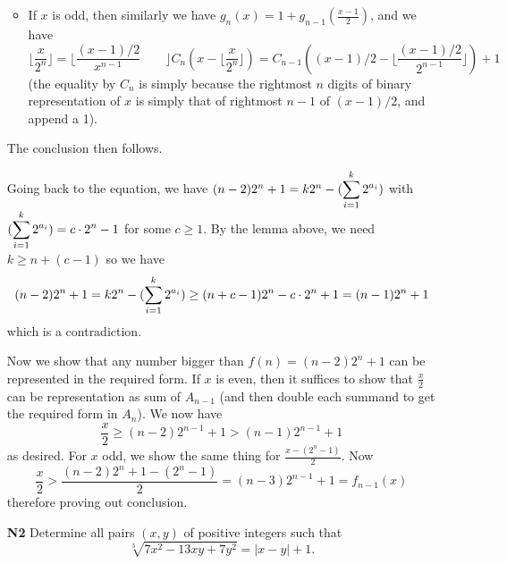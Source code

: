 \documentclass[11pt,a4paper]{article}
\begin{document}
\begin{enumerate}
\begin{itemize}
		\item If $x$ is odd, then similarly we have $g_n(x)=1+g_{n-1}(\frac{x-1}{2})$, and we have 
		\[
		\lfloor\frac{x}{2^{n}}\rfloor = \lfloor\frac{(x-1)/2}{x^{n-1}}\qquad\rfloor C_{n}(x-\lfloor\frac{x}{2^{n}}\rfloor)=C_{n-1}((x-1)/2-\lfloor\frac{(x-1)/2}{2^{n-1}}\rfloor)+1
		\]
		(the equality by $C_n$ is simply because the rightmost $n$ digits of binary representation of $x$ is simply that of rightmost $n-1$ of $(x-1)/2$, and append a 1). 
	\end{itemize}
	
	The conclusion then follows. 
	
	Going back to the equation, we have $(n-2)2^n+1 = k2^n-(\dsum_{i=1}^k 2^{a_i})$ with $(\dsum_{i=1}^k 2^{a_i})=c\cdot 2^n-1$ for some $c\ge 1$. By the lemma above, we need $k\ge n + (c-1)$ so we have 
	\[
	(n-2)2^n+1=
	k2^n-(\dsum_{i=1}^k 2^{a_i})
	\ge (n+c-1)2^n - c\cdot 2^n + 1
	=(n-1)2^n+1
	\]
	which is a contradiction. 
	
	Now we show that any number bigger than $f(n)=(n-2)2^n+1$ can be represented in the required form. If $x$ is even, then it suffices to show that $\frac{x}{2}$ can be representation as sum of $A_{n-1}$ (and then double each summand to get the required form in $A_n$). We now have 
	\[
	\frac{x}{2}\ge (n-2)2^{n-1}+1>(n-1)2^{n-1}+1
	\]
	as desired. For $x$ odd, we show the same thing for $\frac{x-(2^n-1)}{2}$. Now 
	\[
	\frac{x}{2}> \frac{(n-2)2^{n}+1-(2^n-1)}{2}=(n-3)2^{n-1}+1=f_{n-1}(x)
	\]
	therefore proving out conclusion. 

	
	\item [\textbf{N2}] Determine all pairs $(x, y)$ of positive integers such that \[\sqrt[3]{7x^2-13xy+7y^2}=|x-y|+1.\]
	

\end{enumerate}
\end{document}

